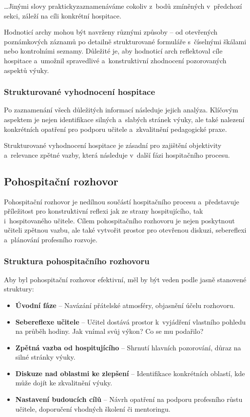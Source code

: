 \ldots{}Jinými slovy praktickyzaznamenáváme cokoliv z~bodů zmíněných v~předchozí sekci, záleží na cíli konkrétní hospitace.

Hodnoticí archy mohou být navrženy různými způsoby – od otevřených poznámkových záznamů po detailně strukturované formuláře s~číselnými škálami nebo kontrolními seznamy. Důležité je, aby hodnoticí arch reflektoval cíle hospitace a~umožnil spravedlivé a~konstruktivní zhodnocení pozorovaných aspektů výuky.

\subsubsection{Strukturované vyhodnocení hospitace}
Po zaznamenání všech důležitých informací následuje jejich analýza. Klíčovým aspektem je nejen identifikace silných a~slabých stránek výuky, ale také nalezení konkrétních opatření pro podporu učitele a~zkvalitnění pedagogické praxe. 

Strukturované vyhodnocení hospitace je zásadní pro zajištění objektivity a~relevance zpětné vazby, která následuje v~další fázi hospitačního procesu.

\subsection{Pohospitační rozhovor}
Pohospitační rozhovor je nedílnou součástí hospitačního procesu a~představuje příležitost pro konstruktivní reflexi jak ze strany hospitujícího, tak i~hospitovaného učitele. Cílem pohospitačního rozhovoru je nejen poskytnout učiteli zpětnou vazbu, ale také vytvořit prostor pro otevřenou diskuzi, sebereflexi a~plánování profesního rozvoje.

\subsubsection{Struktura pohospitačního rozhovoru}
Aby byl pohospitační rozhovor efektivní, měl by být veden podle jasně stanovené struktury:
\begin{itemize}
    \item \textbf{Úvodní fáze} – Navázání přátelské atmosféry, objasnění účelu rozhovoru.
    \item \textbf{Sebereflexe učitele} – Učitel dostává prostor k~vyjádření vlastního pohledu na průběh hodiny. Jak vnímal svůj výkon? Co se mu podařilo?
    \item \textbf{Zpětná vazba od hospitujícího} – Shrnutí hlavních pozorování, důraz na silné stránky výuky.
    \item \textbf{Diskuze nad oblastmi ke zlepšení} – Identifikace konkrétních oblastí, kde může dojít ke zkvalitnění výuky.
    \item \textbf{Nastavení budoucích cílů} – Návrh opatření na podporu profesního růstu učitele, doporučení vhodných školení či mentoringu.
\end{itemize}

